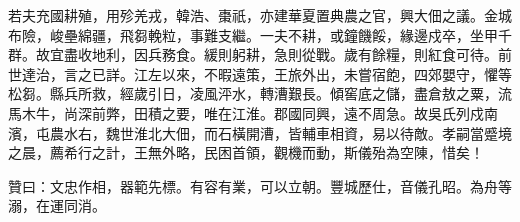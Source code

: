 \begin{pinyinscope}
 若夫充國耕殖，用殄羌戎，韓浩、棗祇，亦建華夏置典農之官，興大佃之議。金城布險，峻壘綿疆，飛芻輓粒，事難支繼。一夫不耕，或鐘饑餒，緣邊戍卒，坐甲千群。故宜盡收地利，因兵務食。緩則躬耕，急則從戰。歲有餘糧，則紅食可待。前世達治，言之已詳。江左以來，不暇遠策，王旅外出，未嘗宿飽，四郊嬰守，懼等松芻。縣兵所救，經歲引日，凌風泙水，轉漕艱長。傾窖底之儲，盡倉敖之粟，流馬木牛，尚深前弊，田積之要，唯在江淮。郡國同興，遠不周急。故吳氏列戍南濱，屯農水右，魏世淮北大佃，而石橫開漕，皆輔車相資，易以待敵。孝嗣當蹙境之晨，薦希行之計，王無外略，民困首領，觀機而動，斯儀殆為空陳，惜矣！



 贊曰：文忠作相，器範先標。有容有業，可以立朝。豐城歷仕，音儀孔昭。為舟等溺，在運同消。



\end{pinyinscope}